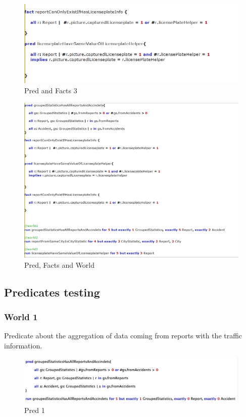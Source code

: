\begin{figure}[h]
	\centering
	\includegraphics[width=0.9\linewidth, height=0.3\textheight]{Images/Alloy/codealloy6}
	\caption{Pred and Facts 3}
	\label{Pred and Facts 3}
\end{figure}

\begin{figure}[h]
	\centering
	\includegraphics[width=0.95\linewidth, height=0.86\textheight]{Images/Alloy/codealloy7}
	\caption{Pred, Facts and World}
	\label{Pred and Facts and World}
\end{figure}
\FloatBarrier
\subsection{Predicates testing}
\subsubsection{World 1}
Predicate about the aggregation of data coming from reports with the traffic information.
\begin{figure}[h]
	\centering
	\includegraphics[width=0.9\linewidth, height=0.15\textheight]{Images/Alloy/test-world11}
	\caption{Pred 1}
	\label{Pred 1}
\end{figure}

